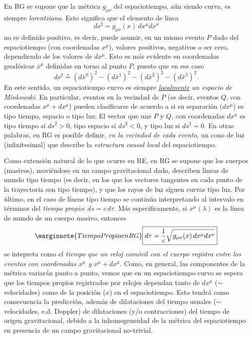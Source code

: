 En RG se supone que la métrica $g_{\mu\nu}$ del espaciotiempo, aún siendo curva, es siempre
\textit{lorentziana}. Esto significa que el elemento de línea
\begin{equation}\label{dsymet}
 ds^2=g_{\mu\nu}(x)\,dx^\mu dx^\nu
\end{equation}
no es definido positivo, es decir, puede asumir, en un mismo evento $P$ dado del espaciotiempo (con coordenadas $x^\mu$), valores positivos, negativos o ser cero,
dependiendo de los valores de $dx^\mu$. Esto es más evidente en coordenadas
geodésicas $\bar{x}^\mu$ definidas en torno al punto $P$, puesto que en ese caso
\begin{equation}
 ds^2\stackrel{*}{=}(d\bar{x}^0)^2-(d\bar{x}^1)^2-(d\bar{x}^2)^2-(d\bar{x}^3)^2.
\end{equation}
En este sentido, un espaciotiempo curvo es siempre
\textit{\underline{localmente} un espacio de Minkowski}. En particular, eventos
en la vecindad de $P$ (es decir, eventos $Q$, con coordenadas $x^\mu+dx^\mu$)
pueden clasificarse de acuerdo a si su separación ($dx^\mu$) es tipo tiempo,
espacio o tipo luz: El vector que une $P$ y $Q$, con coordenadas $dx^\mu$ es
tipo tiempo si $ds^2>0$, tipo espacio si $ds^2<0$, y tipo luz si $ds^2=0$. En
otras palabras, en RG es posible definir, \textit{en la vecindad de cada evento}, un cono de luz (infinitesimal) que describe la \textit{estructura causal local} del espaciotiempo.

Como extensión natural de lo que ocurre en RE, en RG se supone que los cuerpos  (masivos), moviéndose en un campo gravitacional dado, describen
líneas de mundo tipo tiempo (es decir, en los que los vectores
tangentes en cada punto de la trayectoria son tipo tiempo), y que los rayos de luz
siguen curvas tipo luz. Por último, en el caso de líneas tipo tiempo se
continúa interpretando al intervalo en términos del \textit{tiempo propio}:
$ds=c\,d\tau$. Más específicamente, si $x^\mu(\lambda)$ es la línea de mundo
de un cuerpo masivo, entonces
\begin{equation}\marginnote{Tiempo Propio en RG}
\boxed{ d\tau=\frac{1}{c}\sqrt{g_{\mu\nu}(x)\,dx^\mu
dx^\nu}}
\end{equation}
se intepreta como el \textit{tiempo que un reloj comóvil con el cuerpo registra
entre los eventos con coordenadas $x^\mu$ y $x^\mu+dx^\mu$}. Como, en general,
las componentes de la métrica variarán punto a punto, vemos que en un
espaciotiempo curvo se espera que los tiempos propios registrados por relojes
dependan tanto de ${dx^\mu}$ ($\sim$ velocidades) como de la
posición ($x$) en el espaciotiempo. Esto tendrá como consecuencia la
predicción, además de dilataciones del tiempo usuales ($\sim$ velocidades, e.d. Doppler) de dilataciones (y/o contracciones) del tiempo de origen gravitacional, debido a
la inhomogeneidad de la métrica del espaciotiempo en presencia de un campo gravitacional
no-trivial.

